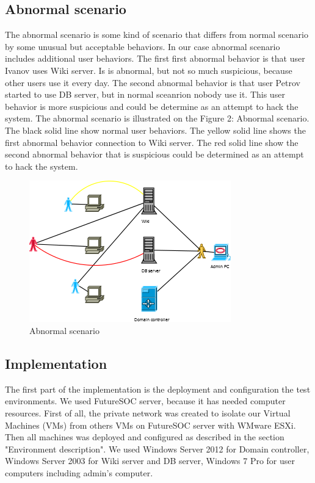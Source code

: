 \subsection{Abnormal scenario}
The abnormal scenario is some kind of scenario that differs from normal scenario by some unusual but acceptable behaviors. In our case abnormal scenario includes additional user behaviors. The first first abnormal behavior is that user Ivanov uses Wiki server. Is is abnormal, but not so much suspicious, because other users use it every day. The second abnormal behavior is that user Petrov started to use DB server, but in normal sceanrion nobody use it. This user  behavior is more suspicious and could be determine as an attempt to hack the system. The abnormal scenario is illustrated on the Figure 2: Abnormal scenario. The black solid line show normal user behaviors. The yellow solid line shows the first abnormal behavior connection to Wiki server. The red solid line show the second abnormal behavior that is suspicious could be determined as an attempt to hack the system. 
\begin{figure}[ht!]
\centering
\includegraphics{scenario_abnormal.png}
\caption{Abnormal scenario}
\label{overflow}
\end{figure}

\subsection{Implementation}
The first part of the implementation is the deployment and configuration the test environments. We used FutureSOC server, because it has needed computer resources. First of all, the private network was created to isolate our Virtual Machines (VMs) from others VMs on FutureSOC server with WMware ESXi. Then all machines was deployed and configured as described in the section "Environment description". We used Windows Server 2012 for Domain controller, Windows Server 2003 for Wiki server and DB server, Windows 7 Pro for user computers including admin's computer. 


